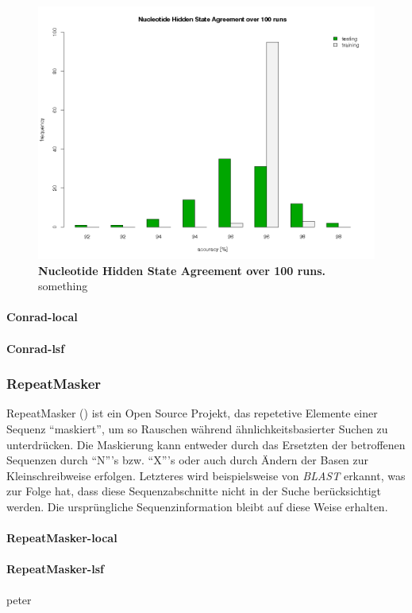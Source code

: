 \begin{figure}[ht]
	\begin{center}
		\includegraphics[scale=0.42]{pics/agree2.png}
	\caption[Nucleotide Hidden State Agreement over 100 runs]{
	\textbf{Nucleotide Hidden State Agreement over 100 runs.}
	something}
	\end{center}
	\label{fig:agree2}
\end{figure}

\paragraph{Conrad-local}
\paragraph{Conrad-lsf}
\subsubsection{RepeatMasker}
RepeatMasker
()
ist ein Open Source Projekt, das repetetive Elemente einer Sequenz
\enquote{maskiert}, um so Rauschen während ähnlichkeitsbasierter Suchen zu
unterdrücken.
Die Maskierung kann entweder durch das Ersetzten der betroffenen Sequenzen
durch \enquote{N}'s bzw. \enquote{X}'s oder auch durch Ändern der Basen zur
Kleinschreibweise erfolgen.
Letzteres wird beispielsweise von \textit{BLAST} erkannt, was zur Folge hat,
dass diese Sequenzabschnitte nicht in der Suche berücksichtigt werden.
Die ursprüngliche Sequenzinformation bleibt auf diese Weise	erhalten.
\paragraph{RepeatMasker-local}
\paragraph{RepeatMasker-lsf}
peter